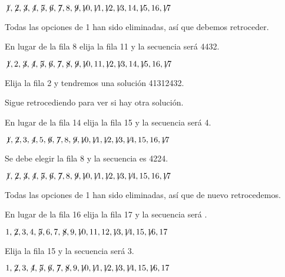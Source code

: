 $\not\! 1,\not\! 2,\not\! 3,\not\! 4,\not\! 5,\not\! 6,\not\! 7,8,\not\! 9,\not\!\! 10,\not\!\! 11,\not\!\! 12,\not\!\! 13,14, \not\!\! 15,16,\not\!\! 17$

\noindent Todas las opciones de 1 han sido eliminadas, así que debemos retroceder.

\smallskip

\noindent En lugar de la fila 8 elija la fila 11 y la secuencia será 44{}3{}2.


$\not\! 1,2,\not\! 3,\not\! 4,\not\! 5,\not\! 6,\not\! 7,\not\! 8,\not\! 9,\not\!\! 10,11,\not\!\! 12,\not\!\! 13,14, \not\!\! 15,16,\not\!\! 17$

\noindent Elija la fila 2 y tendremos una solución 4{}1{}3{}1{}2{}4{}3{}2.

\smallskip

\noindent Sigue retrocediendo para ver si hay otra solución.

\smallskip

\noindent En lugar de la fila 14 elija la fila 15 y la secuencia será 4\textvisiblespace {}.

$\not\! 1,\not\! 2,3,\not\! 4,5,\not\! 6,\not\! 7,8,\not\! 9,\not\!\! 10,\not\!\! 11,\not\!\! 12,\not\!\! 13,\not\!\! 14,15,16,\not\!\! 17$

\noindent Se debe elegir la fila 8 y la secuencia es 4{}22{}4.

$\not\! 1,\not\! 2,\not\! 3,\not\! 4,\not\! 5,\not\! 6,\not\! 7,8,\not\! 9,\not\!\! 10,\not\!\! 11,\not\!\! 12,\not\!\! 13,\not\!\! 14,15,16,\not\!\! 17$

\noindent Todas las opciones de 1 han sido eliminadas, así que de nuevo retrocedemos.

\smallskip

\noindent En lugar de la fila 16 elija la fila 17 y la secuencia será \textvisiblespace \textvisiblespace \textvisiblespace{}\textvisiblespace.

$1,\not\! 2,3,4,\not\! 5,6,7,\not\! 8,9,\not\!\! 10,11,12,\not\!\! 13,\not\!\! 14,15,\not\!\! 16,17$

\noindent Elija la fila 15 y la secuencia será \textvisiblespace{}3.

$1,\not\! 2,3,\not\! 4,\not\! 5,\not\! 6,\not\! 7,\not\! 8,9,\not\!\! 10,\not\!\! 11,\not\!\! 12,\not\!\! 13,\not\!\! 14,15,\not\!\! 16,17$

